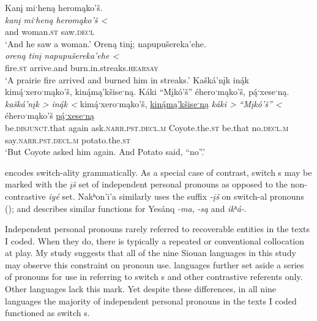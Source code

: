 \documentclass[output=paper]{LSP/langsci}
\begin{document}
\ea\label{ruetaswitchtopic}
\ea\label{ruetanewtopic}
Kanį miˑheną heromąko’š.\footnotemark\\
\gll 	\emph{kanį}	 	\emph{miˑheną} 	\emph{heromąko’š <}\\
	and 			woman.\textsc{st} 	saw.\textsc{decl}\\
\glt	`And he saw a woman.'
\ex\label{ruetaatypicalsubject}
Oreną tinį; napupušereka’ehe.\footnotemark\\
\gll 	\emph{oreną}	\emph{tinį}	\emph{napupušereka’ehe <}\\
	fire.\textsc{st} 	arrive.and 	burn.in.streaks.\textsc{hearsay}\\
\glt	`A prairie fire arrived and burned him in streaks.'
\ex\label{birdcompetition}
Kašká’nįk in\'{ą}k kim\'{ą}ˑxeroˑmąko’š, kin\'{ą}mą’kšiseˑną. Káki “Mįkó’š” éheroˑmąko’š, p\'{ą}ˑxeseˑną.\footnotemark\\
\gll 	\emph{kašká’nįk >}		\emph{in\'{ą}k <} 	kim\'{ą}ˑxeroˑmąko’š, 		\underline{kin\'{ą}mą’kšiseˑną}	\emph{káki >}	\emph{“Mįkó’š” <}			éheroˑmąko’š 			\underline{p\'{ą}ˑxeseˑną}\\
	be.\textsc{disjunct}.that 	again 			ask.\textsc{narr.pst.decl.m} 	Coyote.the.\textsc{st}		be.that 		no.\textsc{decl.m} 					say.\textsc{narr.pst.decl.m} 	potato.the.\textsc{st}\\
\glt	`But Coyote asked him again. And Potato said, “no”.'
\z\z

	 encodes switch-ality grammatically. As a special case of contrast, switch s may be marked with the \emph{įš} set of independent personal pronouns as opposed to the non-contrastive \emph{iyé} set. Nakʰon’i’a similarly uses the suffix \emph{-įš} on switch-al pronouns (\citealt[129--130]{Cumberland2005}); and \citet[149]{Oliverio1996} describes similar functions for Yesánq \emph{-ma}, \emph{-są} and \emph{ikʰá-}. 
	
	Independent personal pronouns rarely referred to recoverable entities in the texts I coded. When they do, there is typically a repeated or conventional collocation at play. My study suggests that all of the nine Siouan languages in this study may observe this constraint on pronoun use.  languages further set aside a series of pronouns for use in referring to switch s and other contrastive referents only. Other languages lack this mark. Yet despite these differences, in all nine languages the majority of independent personal pronouns in the texts I coded functioned as switch s.
\end{document}
